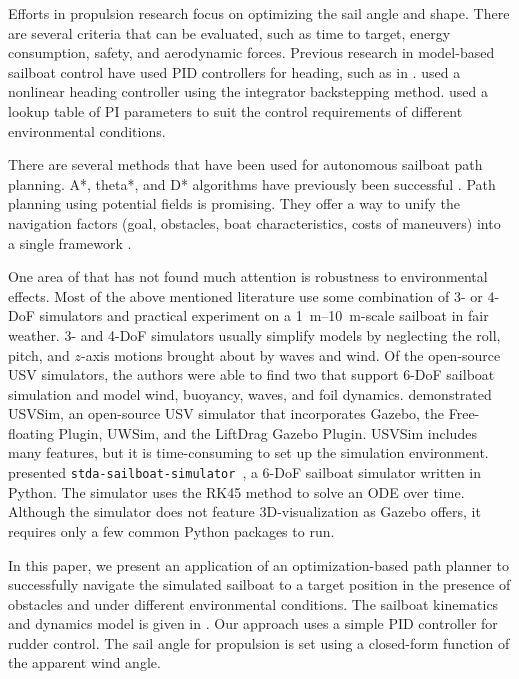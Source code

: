 \documentclass[conference]{IEEEtran}
\newcommand{\Sim}{\lstinline{stda-sailboat-simulator}\ }
\begin{document}
Efforts in propulsion research \cite{Saoud2015, Setiawan2019, DosSantos2020} focus on optimizing the sail angle and shape. There are several criteria that can be evaluated, such as time to target, energy consumption, safety, and aerodynamic forces.
Previous research in model-based sailboat control have used PID controllers for heading, such as in \cite{Cruz2010, Erckens2010}. \cite{Xiao2014} used a nonlinear heading controller using the integrator backstepping method. \cite{Santos2018} used a lookup table of PI parameters to suit the control requirements of different environmental conditions.

There are several methods that have been used for autonomous sailboat path planning. A*, theta*, and D* algorithms have previously been successful \cite{Erckens2010}. Path planning using potential fields is promising. They offer a way to unify the navigation factors (goal, obstacles, boat characteristics, costs of maneuvers) into a single framework \cite{Plumet2013}. 

One area of that has not found much attention is robustness to environmental effects. Most of the above mentioned literature use some combination of 3- or 4-DoF simulators and practical experiment on a \SIrange{1}{10}{\meter}-scale sailboat in fair weather. 3- and 4-DoF simulators usually simplify models by neglecting the roll, pitch, and \(z\)-axis motions brought about by waves and wind. Of the open-source USV simulators, the authors were able to find two that support 6-DoF sailboat simulation and model wind, buoyancy, waves, and foil dynamics. \cite{Paravisi2019} demonstrated USVSim, an open-source USV simulator that incorporates Gazebo, the Free-floating Plugin, UWSim, and the LiftDrag Gazebo Plugin. USVSim includes many features, but it is time-consuming to set up the simulation environment. \cite{Buehler2018} presented \Sim, a 6-DoF sailboat simulator written in Python. The simulator uses the RK45 method to solve an ODE over time. Although the simulator does not feature 3D-visualization as Gazebo offers, it requires only a few common Python packages to run.


In this paper, we present an application of an optimization-based path planner to successfully navigate the simulated sailboat to a target position in the presence of obstacles and under different environmental conditions. The sailboat kinematics and dynamics model is given in \cite{Buehler2018}. Our approach uses a simple PID controller for rudder control. The sail angle for propulsion is set using a closed-form function of the apparent wind angle.
\end{document}
